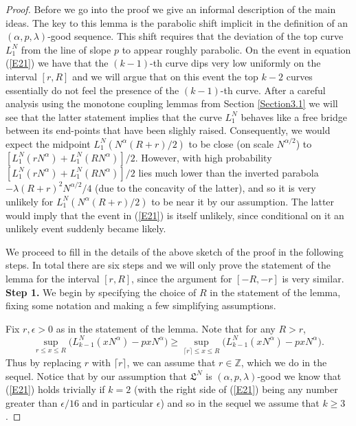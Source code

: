 \begin{proof}
	Before we go into the proof we give an informal description of the main ideas. The key to this lemma is the parabolic shift implicit in the definition of an $(\alpha,p,\lambda)$-good sequence. This shift requires that the deviation of the top curve $L_1^N$ from the line of slope $p$ to appear roughly parabolic. On the event in equation (\ref{E21}) we have that the $(k-1)$-th curve dips very low uniformly on the interval $[r,R]$ and we will argue that on this event the top $k-2$ curves essentially do not feel the presence of the $(k-1)$-th curve. After a careful analysis using the monotone coupling lemmas from Section \ref{Section3.1} we will see that the latter statement implies that the curve $L_1^N$ behaves like a free bridge between its end-points that have been slighly raised. Consequently, we would expect the midpoint $L_1^N \left( N^{\alpha} (R+r)/2 \right)$ to be close (on scale $N^{\alpha/2}$) to $[L_1^N(rN^{\alpha}) + L^N_1(RN^{\alpha})]/2.$ However, with high probability $[L_1^N(rN^{\alpha}) + L^N_1(RN^{\alpha})]/2$ lies much lower than the inverted parabola $-\lambda(R+r)^2 N^{\alpha/2}/4 $ (due to the concavity of the latter), and so it is very unlikely for $L_1^N \left( N^{\alpha} (R+r)/2 \right)$ to be near it by our assumption. The latter would imply that the event in (\ref{E21}) is itself unlikely, since conditional on it an unlikely event suddenly became likely. 
	
	We proceed to fill in the details of the above sketch of the proof in the following steps. In total there are six steps and we will only prove the statement of the lemma for the interval $[r,R]$, since the argument for $[-R,-r]$ is very similar. \\
	
	\noindent\textbf{Step 1.} We begin by specifying the choice of $R$ in the statement of the lemma, fixing some notation and making a few simplifying assumptions. 
	
	Fix $r , \epsilon > 0$ as in the statement of the lemma. Note that for any $R>r$,
	$$\sup_{r\leq x\leq R} \big(L_{k-1}^N(xN^\alpha) - pxN^\alpha\big) \geq \sup_{\lceil r\rceil \leq x \leq R} \big(L_{k-1}^N(xN^\alpha) - pxN^\alpha\big).$$
	Thus by replacing $r$ with $\lceil r\rceil$, we can assume that $r\in\mathbb{Z}$, which we do in the sequel. Notice that by our assumption that $\mathfrak{L}^N$ is $(\alpha, p,\lambda)$-good we know that (\ref{E21}) holds trivially if $k = 2$ (with the right side of (\ref{E21}) being any number greater than $\epsilon/16$ and in particular $\epsilon$) and so in the sequel we assume that $k \geq 3$. 
	

\end{proof}
